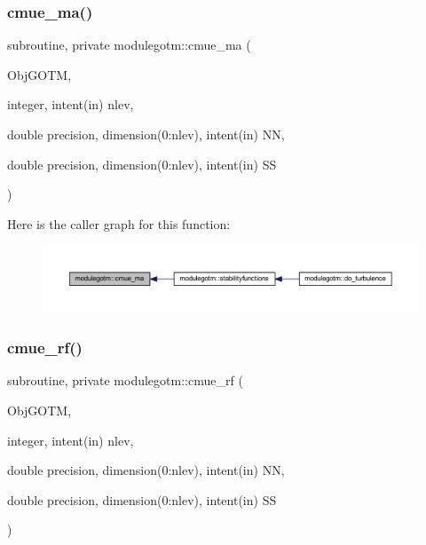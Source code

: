 \subsubsection{\texorpdfstring{cmue\+\_\+ma()}{cmue\_ma()}}
{\footnotesize\ttfamily subroutine, private modulegotm\+::cmue\+\_\+ma (\begin{DoxyParamCaption}\item[{}]{Obj\+G\+O\+TM,  }\item[{integer, intent(in)}]{nlev,  }\item[{double precision, dimension(0\+:nlev), intent(in)}]{NN,  }\item[{double precision, dimension(0\+:nlev), intent(in)}]{SS }\end{DoxyParamCaption})\hspace{0.3cm}{\ttfamily [private]}}

Here is the caller graph for this function\+:\nopagebreak
\begin{figure}[H]
\begin{center}
\leavevmode
\includegraphics[width=350pt]{namespacemodulegotm_a35d3226a2d10d64e249360320b18c8a4_icgraph}
\end{center}
\end{figure}
\mbox{\label{namespacemodulegotm_a9f8f0a6e92610182a87816932d096a5a}} 
\subsubsection{\texorpdfstring{cmue\+\_\+rf()}{cmue\_rf()}}
{\footnotesize\ttfamily subroutine, private modulegotm\+::cmue\+\_\+rf (\begin{DoxyParamCaption}\item[{}]{Obj\+G\+O\+TM,  }\item[{integer, intent(in)}]{nlev,  }\item[{double precision, dimension(0\+:nlev), intent(in)}]{NN,  }\item[{double precision, dimension(0\+:nlev), intent(in)}]{SS }\end{DoxyParamCaption})\hspace{0.3cm}{\ttfamily [private]}}

